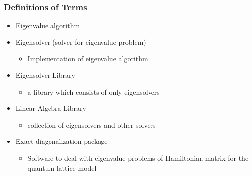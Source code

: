 \begin{frame}
  \frametitle{Definitions of Terms}
  \begin{itemize}
  \item Eigenvalue algorithm
  \item Eigensolver (solver for eigenvalue problem)
    \begin{itemize}
      \item Implementation of eigenvalue algorithm
    \end{itemize}
  \item Eigensolver Library
    \begin{itemize}
      \item a library which consists of only eigensolvers
    \end{itemize}
  \item Linear Algebra Library
    \begin{itemize}
      \item collection of eigensolvers and other solvers
    \end{itemize}
  \item Exact diagonalization package
    \begin{itemize}
      \item Software to deal with eigenvalue problems of Hamiltonian matrix for the quantum lattice model
    \end{itemize}
  \end{itemize}
\end{frame}

